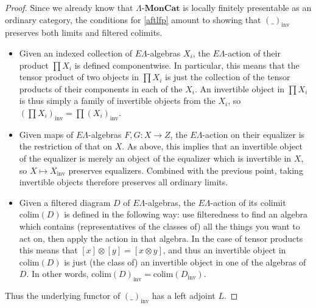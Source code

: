\documentclass{amsbook} %
\newcommand{\mb}{\mathbf}
\newcommand{\ELAlg}{\lmc}
\newcommand{\lmc}{\Lambda\mbox{-}\mb{MonCat}}
\numberwithin{section}{chapter}
\begin{document}
\begin{proof} Since we already know that $\ELAlg$ is locally finitely presentable as an ordinary category, the conditions for \cref{aftlfp} amount to showing that $(\_)_{\mathrm{inv}}$ preserves both limits and filtered colimits.
\begin{itemize}
\item Given an indexed collection of $E\Lambda$-algebras $X_i$, the $E\Lambda$-action of their product $\prod X_i$ is defined componentwise. In particular, this means that the tensor product of two objects in $\prod X_i$ is just the collection of the tensor products of their components in each of the $X_i$. An invertible object in $\prod X_i$ is thus simply a family of invertible objects from the $X_i$, so $(\prod X_i)_{\mathrm{inv}} = \prod (X_i)_{\mathrm{inv}}$.
\item Given maps of $E\Lambda$-algebras $F, G \colon  X \to Z$,  the $E\Lambda$-action on their equalizer is the restriction of that on $X$. As above, this implies that an invertible object of the equalizer is merely an object of the equalizer which is invertible in $X$, so $X \mapsto X_{\mathrm{inv}}$ preserves equalizers. Combined with the previous point, taking invertible objects therefore preserves all ordinary limits.
\item Given a filtered diagram $D$ of $E\Lambda$-algebras, the $E\Lambda$-action of its colimit $\mathrm{colim}(D)$ is defined in the following way: use filteredness to find an algebra which contains (representatives of the classes of) all the things you want to act on, then apply the action in that algebra. In the case of tensor products this means that $[x]\otimes[y] = [x \otimes y]$, and thus an invertible object in $\mathrm{colim}(D)$ is just (the class of) an invertible object in one of the algebras of $D$. In other words, $\mathrm{colim}(D)_{\mathrm{inv}} = \mathrm{colim}(D_{\mathrm{inv}})$.
\end{itemize}
Thus the underlying functor of $(\_)_{\mathrm{inv}}$ has a left adjoint $L$.


\end{proof}
\end{document}
